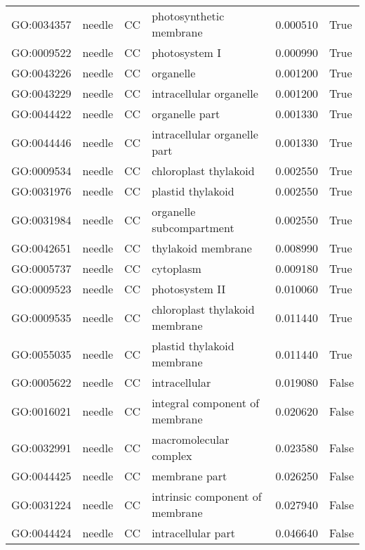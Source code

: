 \begin{longtable}{llllrl}
GO:0034357 & needle & CC &                       photosynthetic membrane  & 0.000510 &    True \\
GO:0009522 & needle & CC &                                 photosystem I  & 0.000990 &    True \\
GO:0043226 & needle & CC &                                     organelle  & 0.001200 &    True \\
GO:0043229 & needle & CC &                       intracellular organelle  & 0.001200 &    True \\
GO:0044422 & needle & CC &                                organelle part  & 0.001330 &    True \\
GO:0044446 & needle & CC &                  intracellular organelle part  & 0.001330 &    True \\
GO:0009534 & needle & CC &                         chloroplast thylakoid  & 0.002550 &    True \\
GO:0031976 & needle & CC &                             plastid thylakoid  & 0.002550 &    True \\
GO:0031984 & needle & CC &                      organelle subcompartment  & 0.002550 &    True \\
GO:0042651 & needle & CC &                            thylakoid membrane  & 0.008990 &    True \\
GO:0005737 & needle & CC &                                     cytoplasm  & 0.009180 &    True \\
GO:0009523 & needle & CC &                                photosystem II  & 0.010060 &    True \\
GO:0009535 & needle & CC &                chloroplast thylakoid membrane  & 0.011440 &    True \\
GO:0055035 & needle & CC &                    plastid thylakoid membrane  & 0.011440 &    True \\
GO:0005622 & needle & CC &                                 intracellular  & 0.019080 &   False \\
GO:0016021 & needle & CC &                integral component of membrane  & 0.020620 &   False \\
GO:0032991 & needle & CC &                        macromolecular complex  & 0.023580 &   False \\
GO:0044425 & needle & CC &                                 membrane part  & 0.026250 &   False \\
GO:0031224 & needle & CC &               intrinsic component of membrane  & 0.027940 &   False \\
GO:0044424 & needle & CC &                            intracellular part  & 0.046640 &   False \\
\bottomrule
\end{longtable}
